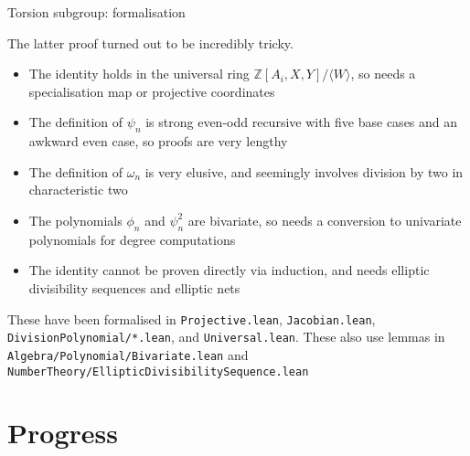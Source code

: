 \documentclass[10pt]{beamer}
\begin{document}
\begin{frame}[t]{Torsion subgroup: formalisation}

The latter proof turned out to be incredibly tricky.

\pause

\begin{itemize}
\item The identity holds in the universal ring $ \mathbb{Z}[A_i, X, Y] / \langle W\rangle $, so needs a specialisation map or projective coordinates

\pause

\item The definition of $ \psi_n $ is strong even-odd recursive with five base cases and an awkward even case, so proofs are very lengthy

\pause

\item The definition of $ \omega_n $ is very elusive, and seemingly involves division by two in characteristic two

\pause

\item The polynomials $ \phi_n $ and $ \psi_n^2 $ are bivariate, so needs a conversion to univariate polynomials for degree computations

\pause

\item The identity cannot be proven directly via induction, and needs elliptic divisibility sequences and elliptic nets
\end{itemize}

\pause

These have been formalised in \texttt{Projective.lean}, \texttt{Jacobian.lean}, \texttt{DivisionPolynomial/*.lean}, and \texttt{Universal.lean}. These also use lemmas in \texttt{Algebra/Polynomial/Bivariate.lean} and \texttt{NumberTheory/EllipticDivisibilitySequence.lean}

\end{frame}

\section{Progress}
\end{document}

